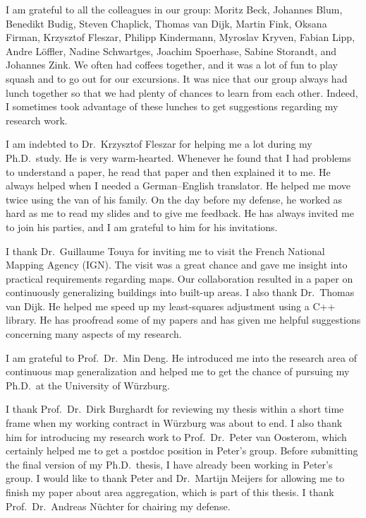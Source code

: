 I am grateful to all the colleagues in our group:
Moritz Beck, Johannes Blum, Benedikt Budig, 
Steven Chaplick, Thomas van Dijk, 
Martin Fink, Oksana Firman, Krzysztof Fleszar, 
Philipp Kindermann, Myroslav Kryven, 
Fabian Lipp, Andre L\"offler, 
Nadine Schwartges, Joachim Spoerhase, Sabine Storandt, 
and Johannes Zink.
%
We often had coffees together,
and it was a lot of fun to play squash and to go out for our excursions.
It was nice that our group always had lunch together
so that we had plenty of chances to learn from each other.
Indeed, I sometimes took advantage of these lunches
to get suggestions regarding my research work.

I am indebted to Dr.\ Krzysztof Fleszar for 
helping me a lot during my Ph.D.\ study.
He is very warm-hearted.
Whenever he found that I had problems to understand a paper,
he read that paper and then explained it to me.
He always helped when I needed a German--English translator.
He helped me move twice using the van of his family.
On the day before my defense, he worked as hard as me
to read my slides and to give me feedback.
He has always invited me to join his parties, 
and I am grateful to him for his invitations.

I thank Dr.\ Guillaume Touya for inviting me to visit
the French National Mapping Agency (IGN).
The visit was a great chance and gave me insight into
practical requirements regarding maps.
Our collaboration resulted in a paper on continuously
generalizing buildings into built-up areas.
%
I also thank Dr.\ Thomas van Dijk.
He helped me speed up my 
least-squares adjustment using a C++ library.
He has proofread some of my papers
and has given me helpful suggestions 
concerning many aspects of my research.

I am grateful to Prof.\ Dr.\ Min Deng.
He introduced me into the research area of 
continuous map generalization 
and helped me to get the chance of
pursuing my Ph.D.\ at the University of W\"urzburg.

I thank Prof.\ Dr.\ Dirk Burghardt 
for reviewing my thesis within a short time frame
when my working contract in W\"urzburg was about to end.
I also thank him for introducing my research work to
Prof.\ Dr.\ Peter van Oosterom, 
which certainly helped me to get a postdoc position
in Peter's group.
Before submitting the final version of my Ph.D.\ thesis,
I have already been working in Peter's group.
I would like to thank Peter and Dr.\ Martijn Meijers 
for allowing me to finish my paper about area aggregation,
which is part of this thesis. 
I thank Prof.\ Dr.\ Andreas N\"uchter for chairing my defense.

